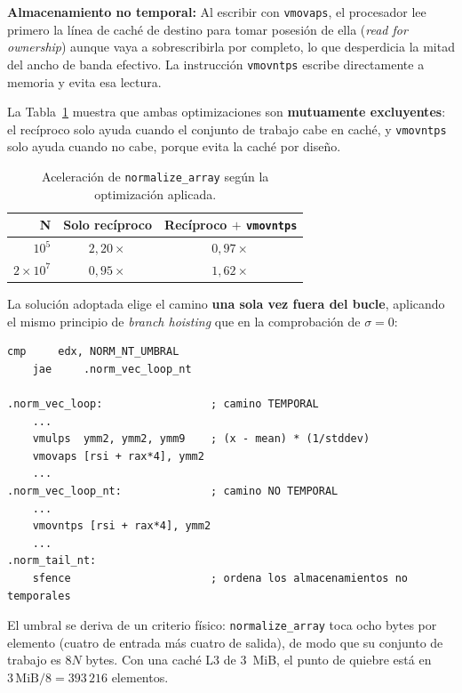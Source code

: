 \documentclass[journal]{IEEEtran}
\begin{document}
\textbf{Almacenamiento no temporal:} Al escribir con \texttt{vmovaps}, el
procesador lee primero la línea de caché de destino para tomar
posesión de ella (\textit{read for ownership}) aunque vaya a
sobrescribirla por completo, lo que desperdicia la mitad del ancho de banda
efectivo. La instrucción \texttt{vmovntps} escribe directamente a memoria
y evita esa lectura.

La Tabla~\ref{tab:optimizacion} muestra que ambas optimizaciones son
\textbf{mutuamente excluyentes}: el recíproco solo ayuda cuando el
conjunto de trabajo cabe en caché, y \texttt{vmovntps} solo ayuda cuando
no cabe, porque evita la caché por diseño.

\begin{table}[h]
\centering
\caption{Aceleración de \texttt{normalize\_array} según la
  optimización aplicada.}
\label{tab:optimizacion}
\footnotesize
\begin{tabular}{|r|c|c|}
\hline
\textbf{N} & \textbf{Solo recíproco} & \textbf{Recíproco $+$ \texttt{vmovntps}} \\ \hline
$10^5$           & $2,20\times$ & $0,97\times$ \\ \hline
$2\times10^7$    & $0,95\times$ & $1,62\times$ \\ \hline
\end{tabular}
\end{table}

La solución adoptada elige el camino \textbf{una sola vez fuera del
bucle}, aplicando el mismo principio de \textit{branch hoisting} que en la
comprobación de $\sigma = 0$:

\begin{lstlisting}[caption={Selección del camino de escritura según el
  tamaño del arreglo.}, label={lst:nt}]
    cmp     edx, NORM_NT_UMBRAL
    jae     .norm_vec_loop_nt

.norm_vec_loop:                 ; camino TEMPORAL
    ...
    vmulps  ymm2, ymm2, ymm9    ; (x - mean) * (1/stddev)
    vmovaps [rsi + rax*4], ymm2
    ...
.norm_vec_loop_nt:              ; camino NO TEMPORAL
    ...
    vmovntps [rsi + rax*4], ymm2
    ...
.norm_tail_nt:
    sfence                      ; ordena los almacenamientos no temporales
\end{lstlisting}

El umbral se deriva de un criterio físico: \texttt{normalize\_array}
toca ocho bytes por elemento (cuatro de entrada más cuatro de salida),
de modo que su conjunto de trabajo es $8N$ bytes. Con una caché L3 de
3~MiB, el punto de quiebre está en
$3\,\mathrm{MiB} / 8 = 393\,216$ elementos.
\end{document}
